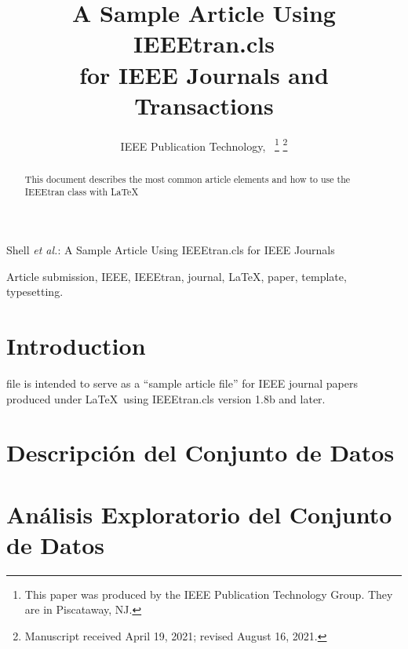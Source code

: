 \documentclass[lettersize,journal]{IEEEtran}
\begin{document}
\title{A Sample Article Using IEEEtran.cls\\ for IEEE Journals and Transactions}

\author{IEEE Publication Technology,~
\thanks{This paper was produced by the IEEE Publication Technology Group. They are in Piscataway, NJ.}%
\thanks{Manuscript received April 19, 2021; revised August 16, 2021.}}

%
{Shell \MakeLowercase{\textit{et al.}}: A Sample Article Using IEEEtran.cls for IEEE Journals}


\maketitle

\begin{abstract}
This document describes the most common article elements and how to use the IEEEtran class with \LaTeX \ 
\end{abstract}

\begin{IEEEkeywords}
Article submission, IEEE, IEEEtran, journal, \LaTeX, paper, template, typesetting.
\end{IEEEkeywords}

\section{Introduction}
 file is intended to serve as a ``sample article file''
for IEEE journal papers produced under \LaTeX\ using
IEEEtran.cls version 1.8b and later. 


\section{Descripción del Conjunto de Datos}


\section{Análisis Exploratorio del Conjunto de Datos}
\end{document}
